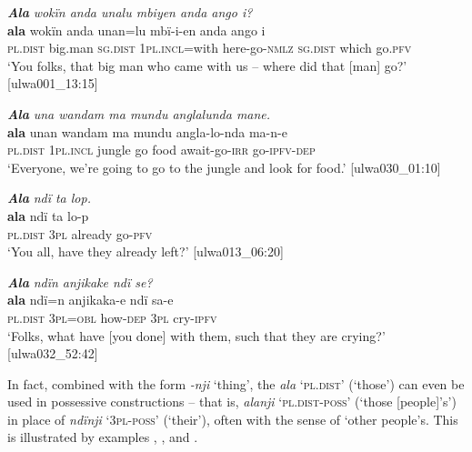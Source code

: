 
\ea%
    \label{ex:det:155}
          \textbf{\textit{Ala}} \textit{wokïn anda unalu mbiyen anda ango i?}\\
\gll    \textbf{ala}      wokïn    anda    unan=lu    mbï-i-en anda    ango  i\\
    \textsc{pl.dist}  big.man  \textsc{sg.dist}  1\textsc{pl.incl}=with  here-go-\textsc{nmlz}    \textsc{sg.dist}  which  go.\textsc{pfv}\\
\glt `You folks, that big man who came with us -- where did that [man] go?’ [ulwa001\_13:15]
\z

\ea%
    \label{ex:det:156}
          \textbf{\textit{Ala}} \textit{una wandam ma mundu anglalunda mane.}\\
\gll    \textbf{ala}      unan    wandam  ma  mundu  angla-lo-nda ma-n-e\\
    \textsc{pl.dist}  1\textsc{pl.incl}  jungle    go  food  await-go-\textsc{irr}    go-\textsc{ipfv-dep}\\
\glt `Everyone, we’re going to go to the jungle and look for food.’ [ulwa030\_01:10]
\z

\ea%
    \label{ex:det:157}
          \textbf{\textit{Ala}} \textit{ndï ta lop.}\\
\gll    \textbf{ala}      ndï  ta    lo-p\\
    \textsc{pl.dist}  3\textsc{pl}  already  go-\textsc{pfv}\\
\glt `You all, have they already left?’ [ulwa013\_06:20]
\z

\ea%
    \label{ex:det:158}
          \textbf{\textit{Ala}} \textit{ndïn anjikake ndï se?}\\
\gll    \textbf{ala}      ndï=n    anjikaka-e    ndï  sa-e\\
    \textsc{pl.dist}  3\textsc{pl=obl}  how-\textsc{dep}    3\textsc{pl}  cry-\textsc{ipfv}\\
\glt `Folks, what have [you done] with them, such that they are crying?’ [ulwa032\_52:42]
\z

In fact, combined with the form \textit{-nji} ‘thing’, the  \textit{ala} ‘\textsc{pl.dist}’ (‘those’) can even be used in  possessive constructions -- that is, \textit{alanji} \linebreak ‘\textsc{pl.dist-poss}’ (‘those [people]’s’) in place of \textit{ndïnji}  ‘\textsc{3pl-poss}’ (‘their’), often with the sense of ‘other people’s. This is illustrated by examples , , and .

